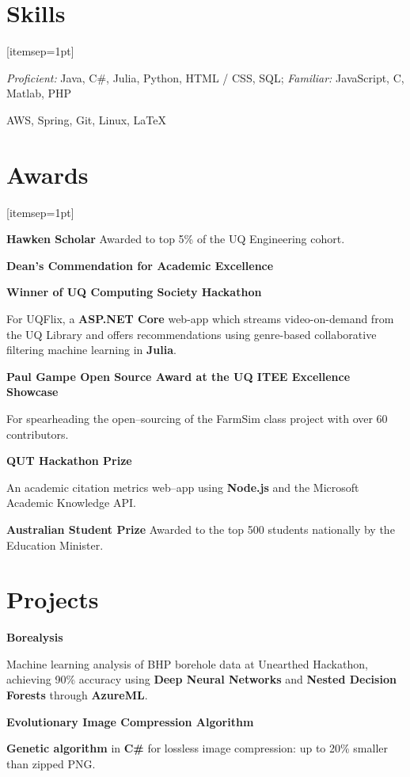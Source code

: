 \documentclass[a4paper]{article}
\renewenvironment{itemize}{
  \begin{list}{}{
    \setlength{\leftmargin}{1.5em}
  }
}{
  \end{list}
}
\newcommand{\dateitem}[1] {\item[\textbf{#1 :}]}
\newcommand{\resumesection}[1]{\section*{\accentcolour #1}}
\newcommand{\accentcolour}{\color{NavyBlue}}
\begin{document}
\resumesection{Skills}
\begin{itemize}[itemsep=1pt]
	\dateitem{Languages} {
%		

	\textit{Proficient:} Java, C\#, Julia, Python, HTML / CSS, SQL;
	\textit{Familiar:} JavaScript, C, Matlab, PHP
	}
	\dateitem{Technologies} {
		AWS, Spring, Git, Linux, \LaTeX
	}
\end{itemize}

\resumesection{Awards}
\begin{itemize}[itemsep=1pt]
	\dateitem{2017 -- 2019} {\textbf{Hawken Scholar} Awarded to top 5\% of the UQ Engineering cohort.
	}
	\dateitem{2016 -- 2018} \textbf{Dean's Commendation for Academic Excellence}
	\dateitem{2016} {\textbf{Winner of UQ Computing Society Hackathon}
		
		For UQFlix, a \textbf{ASP.NET Core} web-app which streams video-on-demand from the UQ Library and offers recommendations using genre-based collaborative filtering machine learning in \textbf{Julia}.
	}
	\dateitem{2015} {\textbf{Paul Gampe Open Source Award at the UQ ITEE Excellence Showcase}
		
		For spearheading the open--sourcing of the FarmSim class project with over 60 contributors.
	}

	\dateitem{2015} {\textbf{QUT Hackathon Prize}
		
		
		An academic citation metrics web--app using \textbf{Node.js} and the Microsoft Academic Knowledge API.
		
	}
	\dateitem{2013} {\textbf{Australian Student Prize} Awarded to the top 500 students nationally by the Education Minister.
	}
\end{itemize}

\resumesection{Projects}
\begin{itemize}	
	\dateitem{2016} {\textbf{Borealysis}
		
		Machine learning analysis of BHP borehole data at Unearthed Hackathon, achieving 90\% accuracy using \textbf{Deep Neural Networks} and \textbf{Nested Decision Forests} through \textbf{AzureML}.
	}
	
	\dateitem{2013} {\textbf{Evolutionary Image Compression Algorithm}
		
		\textbf{Genetic algorithm} in \textbf{C\#} for lossless image compression: up to 20\% smaller than zipped PNG.
	}
\end{itemize}

\bigskip
\end{document}
